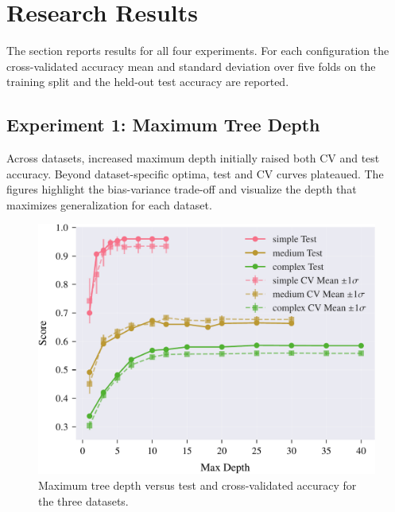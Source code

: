 \documentclass[conference]{IEEEtran}
\begin{document}
\section{Research Results}

The section reports results for all four experiments. For each configuration the cross-validated accuracy mean and standard deviation over five folds on the training split and the held-out test accuracy are reported. 

\subsection{Experiment 1: Maximum Tree Depth}

Across datasets, increased maximum depth initially raised both CV and test accuracy. Beyond dataset-specific optima, test and CV curves plateaued. The figures highlight the bias-variance trade-off and visualize the depth that maximizes generalization for each dataset.

\begin{figure}[H]
  \centering
  \includegraphics[width=\linewidth]{images/all_datasets_depth_accuracy.pdf}
  \caption{Maximum tree depth versus test and cross-validated accuracy for the three datasets.}
  \label{fig:exp1-depth-acc}
\end{figure}
\end{document}
